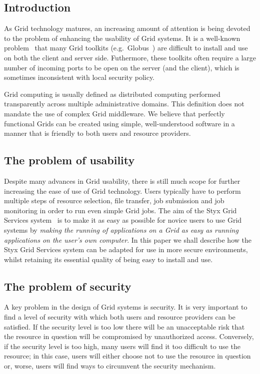 \documentclass[a4paper]{article}
\begin{document}
\begin{multicols}{2}

\section{Introduction}
As Grid technology matures, an increasing amount of attention is being devoted to the problem of enhancing the usability of Grid systems.  It is a well-known problem~\cite{chin:2004} that many Grid toolkits (e.g.\ Globus~\cite{globustoolkit}) are difficult to install and use on both the client and server side.  Futhermore, these toolkits often require a large number of incoming ports to be open on the server (and the client), which is sometimes inconsistent with local security policy.

Grid computing is usually defined as distributed computing performed transparently across multiple administrative domains.  This definition does not mandate the use of complex Grid middleware.  We believe that perfectly functional Grids can be created using simple, well-understood software in a manner that is friendly to both users and resource providers.

\subsection{The problem of usability}
Despite many advances in Grid usability, there is still much scope for further increasing the ease of use of Grid technology.  Users typically have to perform multiple steps of resource selection, file transfer, job submission and job monitoring in order to run even simple Grid jobs.  The aim of the Styx Grid Services system~\cite{blower:2006} is to make it as easy as possible for novice users to use Grid systems by {\em making the running of applications on a Grid as easy as running applications on the user's own computer\/}.  In this paper we shall describe how the Styx Grid Services system can be adapted for use in more secure environments, whilst retaining its essential quality of being easy to install and use.

\subsection{The problem of security}
A key problem in the design of Grid systems is security.  It is very important to find a level of security with which both users and resource providers can be satisfied.  If the security level is too low there will be an unacceptable risk that the resource in question will be compromised by unauthorized access.  Conversely, if the security level is too high, many users will find it too difficult to use the resource; in this case, users will either choose not to use the resource in question or, worse, users will find ways to circumvent the security mechanism.


\end{multicols}
\end{document}
